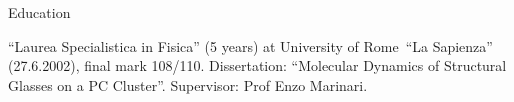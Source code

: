 \begin{rubric}{Education}

\entry*[2002]
``Laurea Specialistica in Fisica'' (5 years) at 
University of Rome~``La Sapienza'' (27.6.2002),
final mark 108/110. Dissertation:
``Molecular Dynamics of Structural Glasses on a PC Cluster''.
Supervisor: Prof Enzo Marinari.




\end{rubric}
